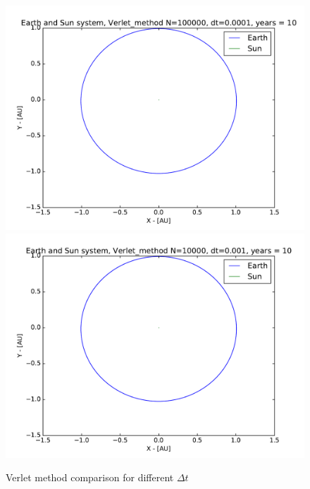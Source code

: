 \documentclass[12pt]{article}
\begin{document}
\begin{figure}[hbtp]
\centering
\includegraphics[width=\linewidth]{Plots/Earth_Sun_Verlet_method.pdf}
\includegraphics[width=\linewidth]{Plots/Earth_Sun_Verlet_method_larger_dt.pdf}
\caption{Verlet method comparison for different $\Delta t$}
\end{figure}

\newpage
\end{document}
